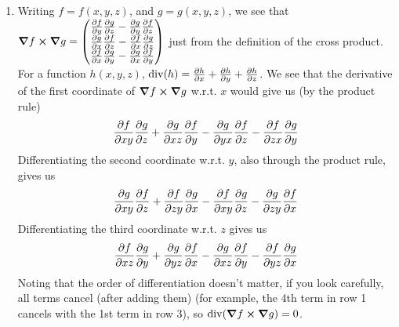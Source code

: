 \documentclass[12pt]{article}
\theoremstyle{definition}
\theoremstyle{remark}
\begin{document}
\begin{enumerate}[leftmargin=\labelsep]
		\item Writing $f = f(x, y, z)$, and $g = g(x, y, z)$, we see that $\grad f \cross \grad g = \begin{pmatrix}
			\pdv{f}{y}\pdv{g}{z} - \pdv{g}{y}\pdv{f}{z} \\
			\pdv{g}{x}\pdv{f}{z} - \pdv{f}{x}\pdv{g}{z} \\
			\pdv{f}{x}\pdv{g}{y} - \pdv{g}{x}\pdv{f}{y}
		\end{pmatrix}$ just from the definition of the cross product. For a function $h(x, y, z)$, $\mathrm{div}(h) = \pdv{h}{x} + \pdv{h}{y} + \pdv{h}{z}$. We see that the derivative of the first coordinate of $\grad f \cross \grad g$ w.r.t. $x$ would give us (by the product rule)
		\begin{align*}
			\pdv{f}{xy}\pdv{g}{z} + \pdv{g}{xz}\pdv{f}{y} - \pdv{g}{yx}\pdv{f}{z} - \pdv{f}{zx}\pdv{g}{y}
		\end{align*}
		Differentiating the second coordinate w.r.t. $y$, also through the product rule, gives us
		\begin{align*}
			\pdv{g}{xy}\pdv{f}{z}+\pdv{f}{zy}\pdv{g}{x}-\pdv{f}{xy}\pdv{g}{z}-\pdv{g}{zy}\pdv{f}{x}
		\end{align*}
		Differentiating the third coordinate w.r.t. $z$ gives us
		\begin{align*}
			\pdv{f}{xz}\pdv{g}{y}+\pdv{g}{yz}\pdv{f}{x}-\pdv{g}{xz}\pdv{f}{y}-\pdv{f}{yz}\pdv{g}{x}
		\end{align*}
		Noting that the order of differentiation doesn't matter, if you look carefully, all terms cancel (after adding them) (for example, the 4th term in row 1 cancels with the 1st term in row 3), so $\mathrm{div}(\grad f \cross \grad g) = 0$.
		\end{enumerate}
\end{document}
